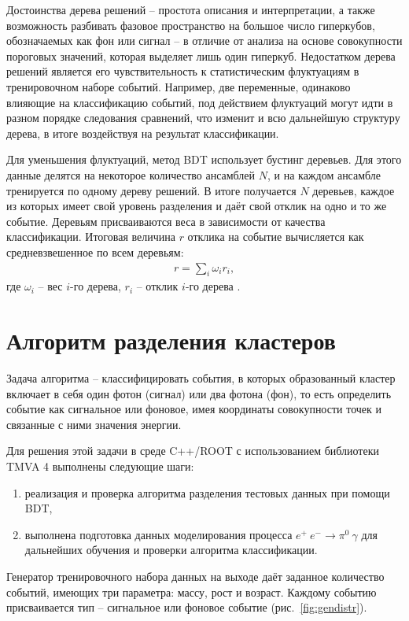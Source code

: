 \documentclass[14pt]{extarticle}
\begin{document}
Достоинства дерева решений -- простота описания и интерпретации, а также возможность разбивать фазовое пространство на большое число гиперкубов, обозначаемых как фон или сигнал -- в отличие от анализа на основе совокупности пороговых значений, которая выделяет лишь один гиперкуб. Недостатком дерева решений является его чувствительность к статистическим флуктуациям в тренировочном наборе событий. Например, две переменные, одинаково влияющие на классификацию событий, под действием флуктуаций могут идти в разном порядке следования сравнений, что изменит и всю дальнейшую структуру дерева, в итоге воздействуя на результат классификации.

Для уменьшения флуктуаций, метод BDT использует бустинг деревьев. Для этого данные делятся на некоторое количество ансамблей $N$, и на каждом ансамбле тренируется по одному дереву решений. В итоге получается $N$ деревьев, каждое из которых имеет свой уровень разделения и даёт свой отклик на одно и то же событие. Деревьям присваиваются веса в зависимости от качества классификации. Итоговая величина $r$ отклика на событие вычисляется как средневзвешенное по всем деревьям:
\begin{align*}
r = \sum_i \omega_i r_i,
\end{align*}
где $\omega_i$ -- вес $i$-го дерева, $r_i$ -- отклик $i$-го дерева \cite{tmva4}.
\section{Алгоритм разделения кластеров}
Задача алгоритма -- классифицировать события, в которых образованный кластер включает в себя один фотон (сигнал) или два фотона (фон), то есть определить событие как сигнальное или фоновое, имея координаты совокупности точек и связанные с ними значения энергии.

Для решения этой задачи в среде C++/ROOT с использованием библиотеки TMVA 4 выполнены следующие шаги:
\begin{enumerate}
    \item реализация и проверка алгоритма разделения тестовых данных при помощи BDT,
    \item выполнена подготовка данных моделирования процесса $e^{+}\:e^{-} \to \pi^{0}\:\gamma$ для дальнейших обучения и проверки алгоритма классификации.
\end{enumerate}

Генератор тренировочного набора данных на выходе даёт заданное количество событий, имеющих три параметра: массу, рост и возраст. Каждому событию присваивается тип -- сигнальное или фоновое событие (рис.~\ref{fig:gendistr}).
\end{document}
